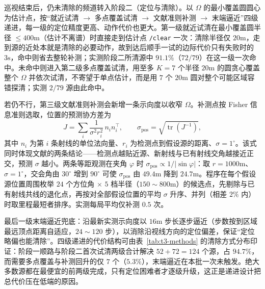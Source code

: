 \documentclass[UTF8, zihao=5,AutoFakeBold=2]{ctexart}
\begin{document}
巡视结束后，仍未清除的频道转入阶段二（定位与清除）。以 \(\Omega\) 的最小覆盖圆圆心为估计点，按“就近试清 \(\to\) 多点覆盖试清 \(\to\) 文献准则补测 \(\to\) 末端逼近”四级递进，每一级的定位精度更高、动作代价也更大。第一级就近试清在最小覆盖圆半径 \(\le 400\text{m}\)（估计不离谱）时直接走到估计点 \texttt{/clear} 一次：清除半径仅 \(20\text{m}\)，走到源的近处本就是清除的必要动作，故到达后顺手一试的边际代价只有失败时的 \(3\text{s}\)，命中则省去整轮补测；实测阶段二所清源中 \(91.1\%\)（\(72/79\)）在这一级一次命中。未命中则进入第二级多点覆盖试清，用至多 \(K=7\) 个半径 \(20\text{m}\) 的圆贪心覆盖整个 \(\Omega\) 并依次试清，不寄望于单点估计，而是用 \(7\) 个 \(20\text{m}\) 圆对整个可能区域容错探清；实测 \(2/79\) 源由此命中。

若仍不行，第三级文献准则补测会新增一条示向度以收窄 \(\Omega\)。补测点按 Fisher 信息准则选取，位置的预测协方差为
\begin{equation}
    J=\sum_i \frac{1}{\sigma^2 r_i^{2}}\,n_i n_i^{\!\top},\qquad
    \sigma_{\text{pos}}=\sqrt{\operatorname{tr}(J^{-1})},
\end{equation}
其中 \(n_i\) 为第 \(i\) 条射线的单位法向量、\(r_i\) 为检测点到假设源的距离、\(\sigma=1^\circ\)。该式同时体现文献的两条结论——检测点越贴近源、新射线与已有射线交角越接近正交，预测 \(\sigma\) 越小。两条等距观测在夹角 \(\varphi\) 时 \(\sigma_{\text{pos}}\propto 1/|\sin\varphi|\)：取 \(r=1000\text{m}\)、\(\sigma=1^\circ\)，交会角由 \(30^\circ\) 增到 \(90^\circ\) 可使 \(\sigma_{\text{pos}}\) 由 \(49.4\text{m}\) 降到 \(24.7\text{m}\)。程序在每个假设源位置周围枚举 \(24\) 个方位角 \(\times\) \(5\) 档半径（\(150\sim800\text{m}\)）的候选点，先剔除与已有射线共线的退化点，再按对全部假设位置的平均 \(\sigma\) 升序、并列（相差 \(2\%\) 内）时取里程最短者排序。实测每局平均仅补测 \(0.5\) 次。

最后一级末端逼近兜底：沿最新实测示向度以 \(16\text{m}\) 步长逐步逼近（步数按到区域最远顶点距离自适应，\(24\sim120\) 步），以消除沿视线方向的定位偏差，保证“定位略偏也能清除”。四级递进的代价结构可由表~\ref{tab:t3-methods} 的清除方式分布印证：阶段一顺路与阶段二首次试清两级合计解决 \(52+72=124\) 个源，占 \(94.7\%\)，而需要多点覆盖与补测回升的仅 \(7\) 个（\(5.3\%\)），末端逼近在本批一次未触发。绝大多数源都在最便宜的前两级完成，只有定位困难者才逐级升级，这正是递进设计把总代价压在低端的原因。
\end{document}
